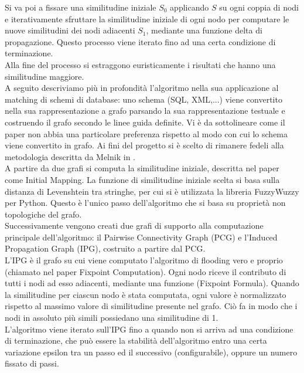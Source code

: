 \documentclass{article}
\begin{document}
Si va poi a fissare una similitudine iniziale $S_0$ applicando $S$ su ogni coppia di nodi e iterativamente sfruttare la similitudine iniziale di ogni nodo per computare le nuove similitudini dei nodi adiacenti $S_1$, mediante una funzione delta di propagazione. Questo processo viene iterato fino ad una certa condizione di terminazione.\\

Alla fine del processo si estraggono euristicamente i risultati che hanno una similitudine maggiore.\\

A seguito descriviamo più in profondità l’algoritmo nella sua applicazione al matching di schemi di database: uno schema (SQL, XML,...) viene convertito nella sua rappresentazione a grafo parsando la sua rappresentazione testuale e costruendo il grafo secondo le linee guida definite. Vi è da sottolineare come il paper non abbia una particolare preferenza rispetto al modo con cui lo schema viene convertito in grafo. Ai fini del progetto si è scelto di rimanere fedeli alla metodologia descritta da Melnik in \citep{generic_model_man}.\\

A partire da due grafi si computa la similitudine iniziale, descritta nel paper come Initial Mapping. La funzione di similitudine iniziale scelta si basa sulla distanza di Levenshtein tra stringhe, per cui si è utilizzata la libreria FuzzyWuzzy per Python. Questo è l’unico passo dell’algoritmo che si basa su proprietà non topologiche del grafo.\\

Successivamente vengono creati due grafi di supporto alla computazione principale dell’algoritmo: il Pairwise Connectivity Graph (PCG) e l’Induced Propagation Graph (IPG), costruito a partire dal PCG.\\ 

L’IPG è il grafo su cui viene computato l’algoritmo di flooding vero e proprio (chiamato nel paper Fixpoint Computation). Ogni nodo riceve il contributo di tutti i nodi ad esso adiacenti, mediante una funzione (Fixpoint Formula). Quando la similitudine per ciascun nodo è stata computata, ogni valore è normalizzato rispetto al massimo valore di similitudine presente nel grafo. Ciò fa in modo che i nodi in assoluto più simili possiedano una similitudine di 1.\\

L’algoritmo viene iterato sull’IPG fino a quando non si arriva ad una condizione di terminazione, che può essere la stabilità dell’algoritmo entro una certa variazione epsilon tra un passo ed il successivo (configurabile), oppure un numero fissato di passi.\\
\end{document}
